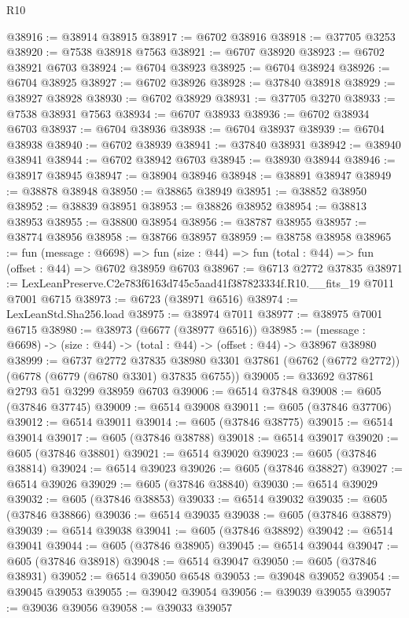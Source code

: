 \begin{lexlean}{R10}
\begin{coremodule}
@38916 := @38914 @38915
@38917 := @6702 @38916
@38918 := @37705 @3253
@38920 := @7538 @38918 @7563
@38921 := @6707 @38920
@38923 := @6702 @38921 @6703
@38924 := @6704 @38923
@38925 := @6704 @38924
@38926 := @6704 @38925
@38927 := @6702 @38926
@38928 := @37840 @38918
@38929 := @38927 @38928
@38930 := @6702 @38929
@38931 := @37705 @3270
@38933 := @7538 @38931 @7563
@38934 := @6707 @38933
@38936 := @6702 @38934 @6703
@38937 := @6704 @38936
@38938 := @6704 @38937
@38939 := @6704 @38938
@38940 := @6702 @38939
@38941 := @37840 @38931
@38942 := @38940 @38941
@38944 := @6702 @38942 @6703
@38945 := @38930 @38944
@38946 := @38917 @38945
@38947 := @38904 @38946
@38948 := @38891 @38947
@38949 := @38878 @38948
@38950 := @38865 @38949
@38951 := @38852 @38950
@38952 := @38839 @38951
@38953 := @38826 @38952
@38954 := @38813 @38953
@38955 := @38800 @38954
@38956 := @38787 @38955
@38957 := @38774 @38956
@38958 := @38766 @38957
@38959 := @38758 @38958
@38965 := fun (message : @6698) =>
  fun (size : @44) => fun (total : @44) => fun (offset : @44) => @6702 @38959 @6703
@38967 := @6713 @2772 @37835
@38971 := LexLeanPreserve.C2e783f6163d745c5aad41f387823334f.R10.__fits_19 @7011 @7001 @6715
@38973 := @6723 (@38971 @6516)
@38974 := LexLeanStd.Sha256.load
@38975 := @38974 @7011
@38977 := @38975 @7001 @6715
@38980 := @38973 (@6677 (@38977 @6516))
@38985 := (message : @6698) -> (size : @44) -> (total : @44) -> (offset : @44) -> @38967 @38980
@38999 := @6737
    @2772
    @37835
    @38980
    @3301
    @37861
    (@6762 (@6772 @2772))
    (@6778 (@6779 (@6780 @3301) @37835 @6755))
@39005 := @33692 @37861 @2793 @51 @3299 @38959 @6703
@39006 := @6514 @37848
@39008 := @605 (@37846 @37745)
@39009 := @6514 @39008
@39011 := @605 (@37846 @37706)
@39012 := @6514 @39011
@39014 := @605 (@37846 @38775)
@39015 := @6514 @39014
@39017 := @605 (@37846 @38788)
@39018 := @6514 @39017
@39020 := @605 (@37846 @38801)
@39021 := @6514 @39020
@39023 := @605 (@37846 @38814)
@39024 := @6514 @39023
@39026 := @605 (@37846 @38827)
@39027 := @6514 @39026
@39029 := @605 (@37846 @38840)
@39030 := @6514 @39029
@39032 := @605 (@37846 @38853)
@39033 := @6514 @39032
@39035 := @605 (@37846 @38866)
@39036 := @6514 @39035
@39038 := @605 (@37846 @38879)
@39039 := @6514 @39038
@39041 := @605 (@37846 @38892)
@39042 := @6514 @39041
@39044 := @605 (@37846 @38905)
@39045 := @6514 @39044
@39047 := @605 (@37846 @38918)
@39048 := @6514 @39047
@39050 := @605 (@37846 @38931)
@39052 := @6514 @39050 @6548
@39053 := @39048 @39052
@39054 := @39045 @39053
@39055 := @39042 @39054
@39056 := @39039 @39055
@39057 := @39036 @39056
@39058 := @39033 @39057

\end{coremodule}
\end{lexlean}
